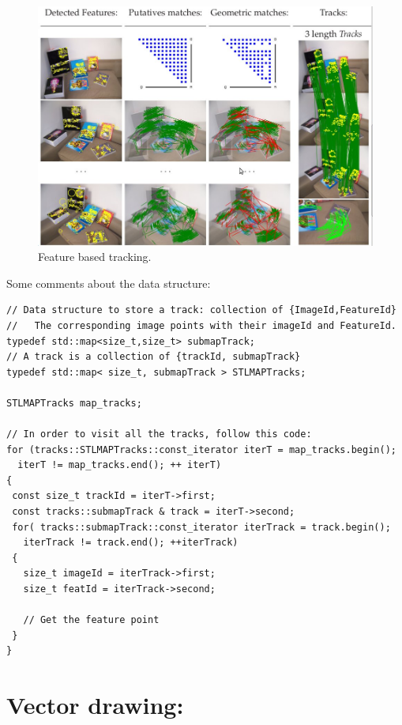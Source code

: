\documentclass[11pt, letterpaper]{report}
\begin{document}
\begin{figure} [h!]
\begin{center}
\includegraphics[scale=.38]{figures/feat_tracking/feat_Tracking_illus.jpeg}
\caption{Feature based tracking.}
\label{fig:tracks}
\end{center}
\end{figure}

Some comments about the data structure:
\vspace{-.5cm}
\begin{lstlisting}
// Data structure to store a track: collection of {ImageId,FeatureId}
//   The corresponding image points with their imageId and FeatureId.
typedef std::map<size_t,size_t> submapTrack;
// A track is a collection of {trackId, submapTrack}
typedef std::map< size_t, submapTrack > STLMAPTracks;

STLMAPTracks map_tracks;

// In order to visit all the tracks, follow this code:
for (tracks::STLMAPTracks::const_iterator iterT = map_tracks.begin();
  iterT != map_tracks.end(); ++ iterT)
{
 const size_t trackId = iterT->first;
 const tracks::submapTrack & track = iterT->second;
 for( tracks::submapTrack::const_iterator iterTrack = track.begin();
   iterTrack != track.end(); ++iterTrack)
 {
   size_t imageId = iterTrack->first;
   size_t featId = iterTrack->second;
   
   // Get the feature point
 }
}
\end{lstlisting}

\newpage
\chapter{Vector drawing:}
\end{document}
